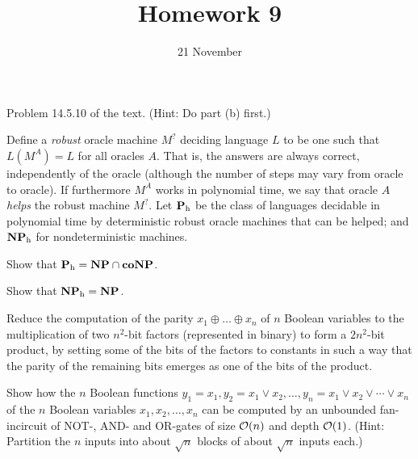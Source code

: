 \documentclass{../math167}
\title{Homework 9}
\author{}
\date{21 November}
\begin{document}
\begin{problems}
\item Problem 14.5.10 of the text.  (Hint: Do part (b) first.)
  \begin{book}
    \newcommand{\h}{_\mathrm h}

    Define a \emph{robust} oracle machine \(M^?\) deciding language
    \(L\) to be one such that \(L(M^A) = L\) for all oracles \(A\).
    That is, the answers are always correct, independently of the
    oracle (although the number of steps may vary from oracle to
    oracle).  If furthermore \(M^A\) works in polynomial time, we say
    that oracle \(A\) \emph{helps} the robust machine \(M^?\).  Let
    \(\P\h\) be the class of languages decidable in polynomial time by
    deterministic robust oracle machines that can be helped; and
    \(\NP\h\) for nondeterministic machines.
    \begin{problems}
    \item Show that \(\P\h = \NP \cap \co\NP\).
    \item Show that \(\NP\h = \NP\).
    \end{problems}
  \end{book}

  \begin{solution}
    \begin{problems}
    \item
    \item
    \end{problems}
  \end{solution}

\item Reduce the computation of the parity
  \(x_1 \oplus \dots \oplus x_n\) of \(n\) Boolean variables to the
  multiplication of two \(n^2\)-bit factors (represented in binary) to
  form a \(2n^2\)-bit product, by setting some of the bits of the
  factors to constants in such a way that the parity of the remaining
  bits emerges as one of the bits of the product.

  \begin{solution}
  \end{solution}

\item Show how the \(n\) Boolean functions
  \(y_1=x_1, y_2 = x_1 \lor x_2, \dots, y_n = x_1 \lor x_2 \lor \cdots
  \lor x_n\) of the \(n\) Boolean variables \(x_1, x_2, \dots, x_n\)
  can be computed by an unbounded fan-incircuit of NOT-, AND- and
  OR-gates of size \(\mathcal O(n)\) and depth \(\mathcal O(1)\). (Hint: Partition the
  \(n\) inputs into about \(\sqrt n\) blocks of about \(\sqrt n\)
  inputs each.)

  \begin{solution}
  \end{solution}

\end{problems}
\end{document}
